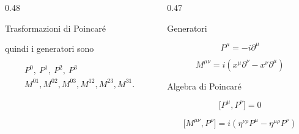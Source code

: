 \documentclass[11pt,t,aspectratio=169]{beamer}
\begin{document}
\begin{frame}[t]
\begin{columns}[T,onlytextwidth]
\begin{column}{0.48\textwidth}
\begin{exampleblock}{Trasformazioni di Poincaré}
\begin{minipage}[t][0.76\textheight][t]{\linewidth}
                    \vspace{-0.4cm}

                    quindi i generatori sono

                    \vspace{-0.3cm}

                    \[
                        \begin{gathered}
                            P^0,\ P^1,\ P^2,\ P^3
                            \\[-0.5em]
                            M^{01},M^{02},M^{03},
                            M^{12},M^{23},M^{31}.
                        \end{gathered}
                    \]

                    \vspace{-0.3cm}

                \end{minipage}

            \end{exampleblock}

        \end{column}

        \hfill


        \begin{column}{0.47\textwidth}

            \begin{block}{Generatori}

              \[
    P^\mu=-i\partial^\mu
\]

\[
M^{\mu\nu}
=
i\left(
x^\mu \partial^\nu
-
x^\nu \partial^\mu
\right)
\]
            \end{block}

            \begin{block}{Algebra di Poincaré}

                \begin{minipage}[t][0.45\textheight][t]{\linewidth}

                    \[
                        \bigl[P^\mu,P^\nu\bigr]=0
                    \]

                    \[
                        \bigl[M^{\mu\nu},P^\rho\bigr]
                        =
                        i\left(
                            \eta^{\nu\rho}P^\mu
                            -
                            \eta^{\mu\rho}P^\nu
                        \right)
                    \]


\end{minipage}
\end{block}
\end{column}
\end{columns}
\end{frame}
\end{document}
